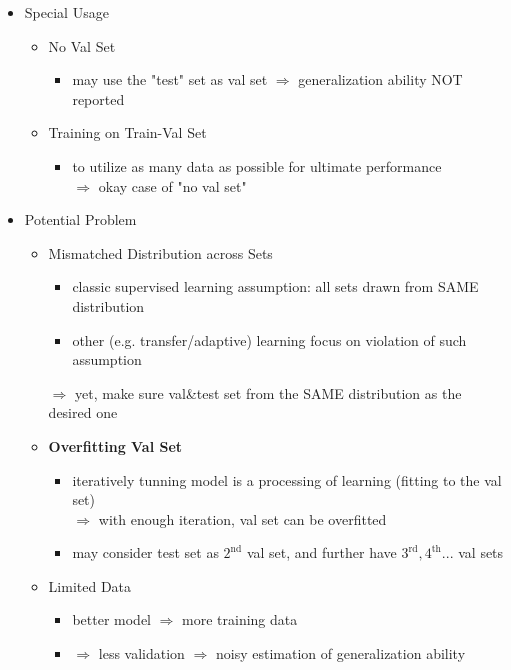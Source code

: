 \begin{itemize}
\item Special Usage
	\begin{itemize}
	\item No Val Set
		\begin{itemize}
		\item may use the "test" set as val set $\Rightarrow$ generalization ability NOT reported
		\end{itemize}
	\item Training on Train-Val Set
		\begin{itemize}
		\item to utilize as many data as possible for ultimate performance \\ 
		$\Rightarrow$ okay case of "no val set"
		\end{itemize}
	\end{itemize}

\item Potential Problem
	\begin{itemize}
	\item Mismatched Distribution across Sets
		\begin{itemize}
		\item classic supervised learning assumption: all sets drawn from SAME distribution
		\item other (e.g. transfer/adaptive) learning focus on violation of such assumption
		\end{itemize}
		$\Rightarrow$ yet, make sure val\&test set from the SAME distribution as the desired one
	\item \textbf{Overfitting Val Set}
		\begin{itemize}
		\item iteratively tunning model is a processing of learning (fitting to the val set) \\
		$\Rightarrow$ with enough iteration, val set can be overfitted
		\item may consider test set as $2^\text{nd}$ val set, and further have $3^\text{rd}, 4^\text{th}...$ val sets
		\end{itemize}
	\item Limited Data
		\begin{itemize}
		\item better model $\Rightarrow$ more training data 
		\item $\Rightarrow$ less validation $\Rightarrow$ noisy estimation of generalization ability
		\end{itemize}
	\end{itemize}
\end{itemize}

